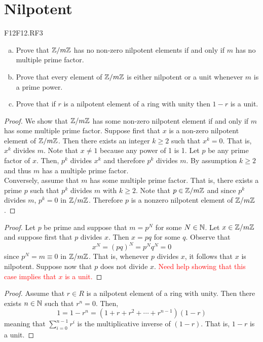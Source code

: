 \documentclass[../AlgebraQualSolutions.tex]{subfiles}
\begin{document}
\section{Nilpotent}

\begin{prob}{F12}{F12.RF3}
\begin{enumerate}[(a)]
\item Prove that $\mathbb{Z}/m\mathbb{Z}$ has no non-zero nilpotent elements if and only if $m$ has no multiple prime factor.
\item Prove that every element of $\mathbb{Z}/m\mathbb{Z}$ is either nilpotent or a unit whenever $m$ is a prime power.
\item Prove that if $r$ is a nilpotent element of a ring with unity then $1-r$ is a unit.
\end{enumerate}
\end{prob}

\begin{proof}
    We show that $\mathbb{Z}/m\mathbb{Z}$ has some non-zero nilpotent element if and only if $m$ has some multiple prime factor. Suppose first that $x$ is a non-zero nilpotent element of $\mathbb{Z}/m\mathbb{Z}$. Then there exists an integer $k \geq 2$ such that $x^k = 0$. That is, $x^k$ divides $m$. Note that $x \neq 1$ because any power of 1 is 1. Let $p$ be any prime factor of $x$. Then, $p^k$ divides $x^k$ and therefore $p^k$ divides $m$. By assumption $k \geq 2$ and thus $m$ has a multiple prime factor.\\

    Conversely, assume that $m$ has some multiple prime factor. That is, there exists a prime $p$ such that $p^k$ divides $m$ with $k \geq 2$. Note that $p \in \mathbb{Z}/m\mathbb{Z}$ and since $p^k$ divides $m$, $p^k = 0$ in $\mathbb{Z}/m\mathbb{Z}$. Therefore $p$ is a nonzero nilpotent element of $\mathbb{Z}/m\mathbb{Z}$.
\end{proof}

\begin{proof}
    Let $p$ be prime and suppose that $m = p^N$ for some $N \in \mathbb{N}$. Let $x \in \mathbb{Z}/m\mathbb{Z}$ and suppose first that $p$ divides $x$. Then $x = pq$ for some $q$. Observe that
        \[x^N = (pq)^N = p^Nq^N = 0\]
    since $p^N = m \equiv 0$ in $\mathbb{Z}/m\mathbb{Z}$. That is, whenever $p$ divides $x$, it follows that $x$ is nilpotent. Suppose now that $p$ does not divide $x$. \textcolor{red}{Need help showing that this case implies that $x$ is a unit.}
\end{proof}

\begin{proof}
    Assume that $r \in R$ is a nilpotent element of a ring with unity. Then there exists $n \in \mathbb{N}$ such that $r^n = 0$. Then,
        \[1 = 1 - r^n = (1 + r + r^2 + \cdots + r^{n-1})(1-r)\]
    meaning that $\sum_{i=0}^{n-1}r^i$ is the multiplicative inverse of $(1-r)$. That is, $1-r$ is a unit.
\end{proof}
\end{document}
